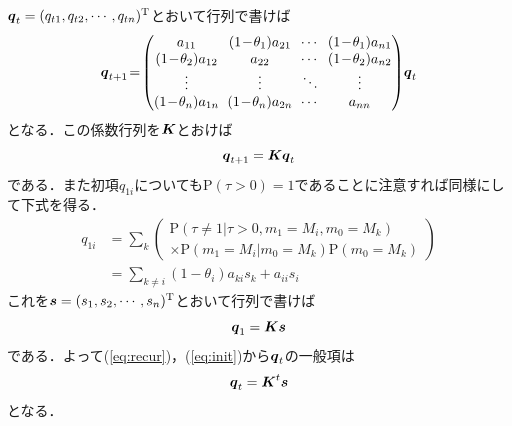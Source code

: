 $ \boldsymbol{q}_t = (q_{t 1} , q_{t 2} , \cdots , q_{t n})^\mathrm{T} $とおいて行列で書けば
\begin{equation*}
    \arraycolsep3pt
    \V{q}_{t + 1} \! = \!
    \begin{pmatrix}
        a_{1 1} & (1 \! - \! \theta_1) a_{2 1} & \cdots & (1 \! - \! \theta_1) a_{n 1} \\
        (1 \! - \! \theta_2) a_{1 2} & a_{2 2} & \cdots & (1 \! - \! \theta_2) a_{n 2} \\
        \vdots & \vdots & \ddots & \vdots \\
        (1 \! - \! \theta_n) a_{1 n} & (1 \! - \! \theta_n) a_{2 n} & \cdots & a_{n n} \\
    \end{pmatrix}
    \! \V{q}_t
\end{equation*}
となる．この係数行列を$ \boldsymbol{K} $とおけば
\begin{equation} \label{eq:recur}
    \boldsymbol{q}_{t + 1} = \boldsymbol{K} \boldsymbol{q}_t
\end{equation}
である．また初項$ q_{1 i} $についても$ \mathrm{P}(\tau > 0) = 1 $であることに注意すれば同様にして下式を得る．
\begin{align*}
    q_{1 i} & = \! \sum_{k} \left(
        \begin{array}{l}
            \mathrm{P}(\tau \ne 1 | \tau > 0 , m_1 = M_i , m_0 = M_k) \\
            \times \mathrm{P}(m_1 = M_i | m_0 = M_k) \mathrm{P}(m_0 = M_k)
        \end{array}
    \right) \\
    & = \! \sum_{k \ne i} (1 - \theta_i) a_{k i} s_k + a_{i i} s_i
\end{align*}
これを$ \boldsymbol{s} = (s_1 , s_2 , \cdots , s_n)^\mathrm{T} $とおいて行列で書けば
\begin{equation} \label{eq:init}
    \boldsymbol{q}_1 = \boldsymbol{K} \boldsymbol{s}
\end{equation}
である．よって(\ref{eq:recur})，(\ref{eq:init})から$ \boldsymbol{q}_t $の一般項は
\begin{equation} \label{eq:qt}
    \boldsymbol{q}_t = \boldsymbol{K}^t \boldsymbol{s}
\end{equation}
となる．

